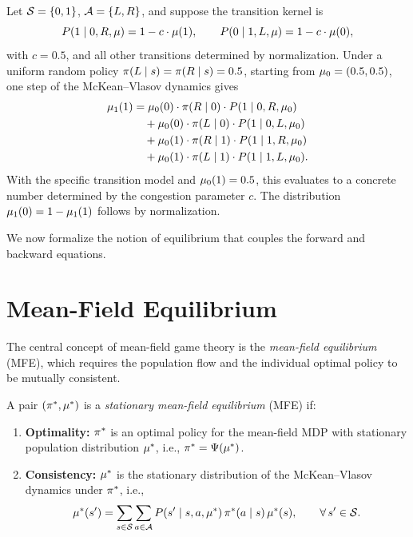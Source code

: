\documentclass[11pt,a4paper]{article}
\begin{document}
\begin{example}
\label{ex:two-state-mv}
Let $\mathcal{S} = \{0, 1\}$, $\mathcal{A} = \{L, R\}$, and suppose the
transition kernel is
\[
  P(1 \mid 0, R, \mu) = 1 - c \cdot \mu(1),
  \qquad
  P(0 \mid 1, L, \mu) = 1 - c \cdot \mu(0),
\]
with $c = 0.5$, and all other transitions determined by
normalization.  Under a uniform random policy $\pi(L \mid s)
= \pi(R \mid s) = 0.5$, starting from $\mu_0 = (0.5,
0.5)$, one step of the McKean--Vlasov dynamics gives
\begin{align*}
  \mu_1(1)
  &= \mu_0(0) \cdot \pi(R \mid 0)
    \cdot P(1 \mid 0, R, \mu_0) \\
  &\quad + \mu_0(0) \cdot \pi(L \mid 0)
    \cdot P(1 \mid 0, L, \mu_0) \\
  &\quad + \mu_0(1) \cdot \pi(R \mid 1)
    \cdot P(1 \mid 1, R, \mu_0) \\
  &\quad + \mu_0(1) \cdot \pi(L \mid 1)
    \cdot P(1 \mid 1, L, \mu_0).
\end{align*}
With the specific transition model and $\mu_0(1) = 0.5$,
this evaluates to a concrete number determined by the congestion
parameter $c$.  The distribution $\mu_1(0) = 1 -
\mu_1(1)$ follows by normalization.
\end{example}

We now formalize the notion of equilibrium that couples the forward
and backward equations.


\section{Mean-Field Equilibrium}
\label{sec:mf-equilibrium}

The central concept of mean-field game theory is the
\emph{mean-field equilibrium} (MFE), which requires the
population flow and the individual optimal policy to be mutually
consistent.

\begin{definition}
\label{def:mfe-stationary}
A pair $(\pi^*, \mu^*)$ is a \emph{stationary
mean-field equilibrium} (MFE) if:
\begin{enumerate}[nosep]
  \item \textbf{Optimality:} $\pi^*$ is an optimal policy for
    the mean-field MDP with stationary population distribution
    $\mu^*$, i.e., $\pi^* = \Psi(\mu^*)$.
  \item \textbf{Consistency:} $\mu^*$ is the stationary
    distribution of the McKean--Vlasov dynamics
    under $\pi^*$, i.e.,
    \[
      \mu^*(s')
      = \sum_{s \in \mathcal{S}} \sum_{a \in \mathcal{A}}
        P(s' \mid s, a, \mu^*)\,
        \pi^*(a \mid s)\, \mu^*(s),
        \qquad \forall\, s' \in \mathcal{S}.
    \]
\end{enumerate}
\end{definition}
\end{document}
